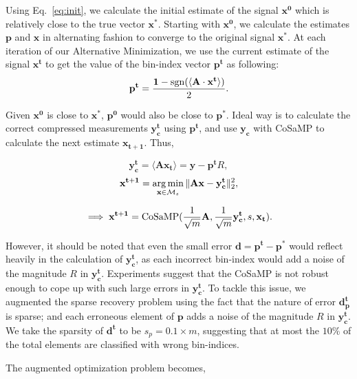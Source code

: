Using Eq.~\ref{eq:init}, we calculate the initial estimate of the signal $\mathbf{{x}^0}$ which is relatively close to the true vector $\mathbf{x^*}$. Starting with $\mathbf{{x}^0}$, we  calculate the estimates $\mathbf{p}$ and $\mathbf{x}$ in alternating fashion to converge to the original signal $\mathbf{x^*}$. At each iteration of our Alternative Minimization, we use the current estimate of the signal ${\mathbf{x^t}}$ to get the value of the bin-index vector $\mathbf{{p}^t}$ as following:
\begin{equation}
\mathbf{{p}^{t}} = \frac{\mathbf{1}-\mathrm{sgn}(\langle \mathbf{A} \cdot \mathbf{x^t} \rangle)}{2}.
\label{step1}
\end{equation}

 
 Given $\mathbf{x^0}$ is close to $\mathbf{x^*}$, $\mathbf{p^0}$ would also be close to $\mathbf{p^*}$. Ideal way is to calculate the correct compressed measurements $\mathbf{y^t_c}$ using $\mathbf{p^t}$, and use $\mathbf{y_c}$ with CoSaMP to calculate the next estimate $\mathbf{{x}_{t+1}}$. Thus,


$$
\mathbf{y^t_c} = \langle \mathbf{A}\mathbf{x_{t}} \rangle = \mathbf{y} - \mathbf{p^t}R,
$$
$$
\mathbf{{x}^{t+1}} = \argmin_{\mathbf{x} \in \mathcal{M}_s}\norm{\mathbf{Ax} - \mathbf{y^t_c}}_2^2, %
$$

\begin{equation}
\implies \mathbf{{x}^{t+1}} = \mathrm{CoSaMP}(\frac{1}{\sqrt{m}}\mathbf{A},\frac{1}{\sqrt{m}}\mathbf{y^t_c},s,\mathbf{x_t}).
\label{eq:cosamp}
\end{equation}


 However, it should be noted that even the small error $\mathbf{d} = \mathbf{p^t - p^*}$ would reflect heavily in the calculation of $\mathbf{y^t_c}$, as each incorrect bin-index would add a noise of the magnitude $R$ in $\mathbf{y^t_c}$. Experiments suggest that the CoSaMP is not robust enough to cope up with such large errors in $\mathbf{y^t_c}$. To tackle this issue, we augmented the sparse recovery problem using the fact that the nature of error $\mathbf{d^t_p}$ is sparse; and each erroneous element of $\mathbf{p}$ adds a noise of the magnitude $R$ in $\mathbf{y^t_c}$. We take the sparsity of $\mathbf{d^t}$ to be $s_p = 0.1\times m$, suggesting that at most the $10\%$ of the total elements are classified with wrong bin-indices.
 
 The augmented optimization problem becomes,
  
